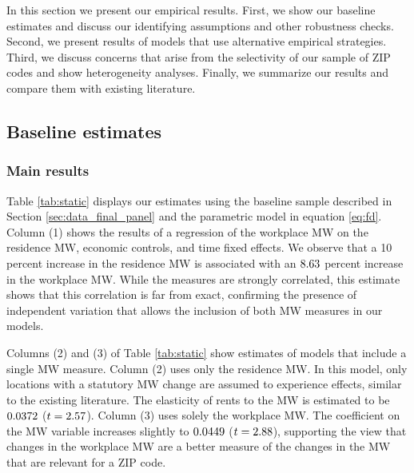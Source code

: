 
In this section we present our empirical results.
First, we show our baseline estimates and discuss our identifying assumptions
and other robustness checks.
Second, we present results of models that use alternative empirical strategies.
Third, we discuss concerns that arise from the selectivity of our sample of 
ZIP codes and show heterogeneity analyses. 
Finally, we summarize our results and compare them with existing literature.

\subsection{Baseline estimates}
\label{sec:results_main}

\subsubsection{Main results}

Table \ref{tab:static} displays our estimates using the baseline sample 
described in Section \ref{sec:data_final_panel} and the parametric model
in equation \eqref{eq:fd}.
Column (1) shows the results of a regression of the workplace MW on the 
residence MW, economic controls, and time fixed effects.
We observe that a 10 percent increase in the residence MW is associated with an
$8.63$ percent increase in the workplace MW.
While the measures are strongly correlated, this estimate shows that this 
correlation is far from exact, confirming the presence of independent variation
that allows the inclusion of both MW measures in our models.

Columns (2) and (3) of Table \ref{tab:static} show estimates of models that 
include a single MW measure.
Column (2) uses only the residence MW.
In this model, only locations with a statutory MW change are assumed to 
experience effects, similar to the existing literature.
The elasticity of rents to the MW is estimated to be 
$0.0372$ ($t=2.57$).
Column (3) uses solely the workplace MW.
The coefficient on the MW variable increases slightly to 
$0.0449$ ($t=2.88$), 
supporting the view that changes in the workplace MW are a better measure of 
the changes in the MW that are relevant for a ZIP code.

